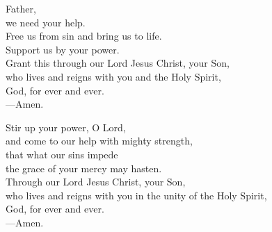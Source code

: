 \prayer


\begin{prayerverse}
Father,\\
we need your help.\\
Free us from sin and bring us to life.\\
Support us by your power.\\
Grant this through our Lord Jesus Christ, your Son,\\
who lives and reigns with you and the Holy Spirit,\\
God, for ever and ever.\\
{\color{red}---\thinspace}Amen.
\end{prayerverse}


\begin{prayerverse}
Stir up your power, O Lord,\\
and come to our help with mighty strength,\\
that what our sins impede\\
the grace of your mercy may hasten.\\
Through our Lord Jesus Christ, your Son,\\
who lives and reigns with you in the unity of the Holy Spirit,\\
God, for ever and ever.\\
{\color{red}---\thinspace}Amen.
\end{prayerverse}

